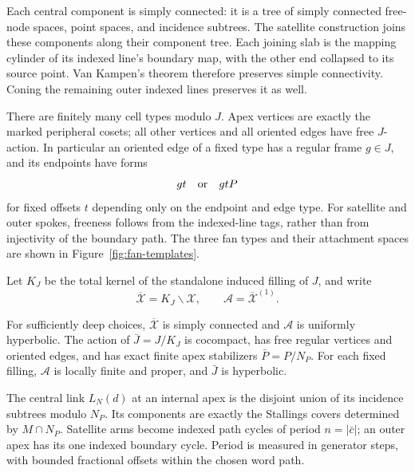Each central component is simply connected: it is a tree of simply
connected free-node spaces, point spaces, and incidence subtrees.  The
satellite construction joins these components along their component
tree.  Each joining slab is the mapping cylinder of its indexed line's
boundary map, with the other end collapsed to its source point.
Van Kampen's theorem therefore preserves simple connectivity.  Coning
the remaining outer indexed lines preserves it as well.

There are finitely many cell types modulo $J$.  Apex vertices are
exactly the marked peripheral cosets; all other vertices and all
oriented edges have free $J$-action.  In particular an oriented edge of
a fixed type has a regular frame $g\in J$, and its endpoints have forms
\begin{equation}\label{fan:frame-formula}
 gt\quad\hbox{or}\quad gtP
\end{equation}
for fixed offsets $t$ depending only on the endpoint and edge type.
For satellite and outer spokes, freeness follows from the indexed-line
tags, rather than from injectivity of the boundary path. The three fan
types and their attachment spaces are shown in
Figure~\ref{fig:fan-templates}.


Let $K_J$ be the total kernel of the standalone induced filling of $J$,
and write
\[
 \overline{\mathcal X}=K_J\backslash\mathcal X,
 \qquad \mathcal A=\overline{\mathcal X}^{(1)}.
\]

\begin{lemma}\label{fan:filled-model}
For sufficiently deep choices, $\overline{\mathcal X}$ is simply
connected and $\mathcal A$ is uniformly hyperbolic.  The action of
$\bar J=J/K_J$ is cocompact, has free regular vertices and oriented
edges, and has exact finite apex stabilizers $\bar P=P/N_P$.
For each fixed filling, $\mathcal A$ is locally finite and proper, and
$\bar J$ is hyperbolic.

The central link $L_N(d)$ at an internal apex is the disjoint union of
its incidence subtrees modulo $N_P$.  Its components are exactly the
Stallings covers determined by $M\cap N_P$.  Satellite arms become
indexed path cycles of period $n=|\bar c|$; an outer apex has its one
indexed boundary cycle.  Period is measured in generator steps, with
bounded fractional offsets within the chosen word path.
\end{lemma}


